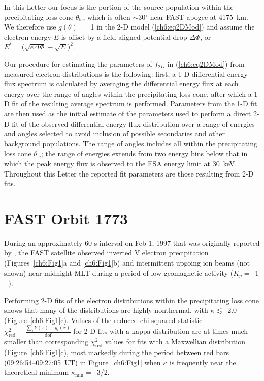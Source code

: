 
  In this Letter our focus is the portion of the source population
  within the precipitating loss cone $\theta_{\textrm{lc}}$, which is
  often $\sim$30$^\circ$ near FAST apogee at 4175~km. We therefore use
  $g(\theta) =$~1 in the 2-D model (\ref{ch6:eq2DMod}) and assume the
  electron energy $E$ is offset by a field-aligned potential drop
  $\Delta \Phi$, or $E^* = \big( \sqrt{e \Delta \Phi} - \sqrt{E}
  \big)^2$.

  Our procedure for estimating the parameters of $f_{2D}$ in
  (\ref{ch6:eq2DMod}) from measured electron distributions is the
  following: first, a 1-D differential energy flux spectrum is
  calculated by averaging the differential energy flux at each energy
  over the range of angles within the precipitating loss cone, after
  which a 1-D fit of the resulting average spectrum is
  performed. Parameters from the 1-D fit are then used as the initial
  estimate of the parameters used to perform a direct 2-D fit of the
  observed differential energy flux distribution over a range of
  energies and angles selected to avoid inclusion of possible
  secondaries and other background populations. The range of angles
  includes all within the precipitating loss cone
  $\theta_{\textrm{lc}}$; the range of energies extends from two
  energy bins below that in which the peak energy flux is observed to
  the ESA energy limit at 30~keV. Throughout this Letter the reported
  fit parameters are those resulting from 2-D fits.

  \section{FAST Orbit 1773}

  During an approximately 60-s interval on Feb 1, 1997 that was
  originally reported by \citet{Elphic1998}, the FAST satellite
  observed inverted V electron precipitation (Figures~\ref{ch6:Fig1}a
  and \ref{ch6:Fig1}b) and intermittent upgoing ion beams (not shown)
  near midnight MLT during a period of low geomagnetic activity ($K_p
  =$~1$^-$).

  Performing 2-D fits of the electron distributions within the
  precipitating loss cone shows that many of the distributions are
  highly nonthermal, with $\kappa \lesssim$~2.0
  (Figure~\ref{ch6:Fig1}c). Values of the reduced chi-squared
  statistic $\chi^2_{\mathrm{red}} = \frac{\sum_i Y(x) -
    y_i(x)}{\mathrm{dof}}$ for 2-D fits with a kappa distribution are
  at times much smaller than corresponding $\chi^2_{\textrm{red}}$
  values for fits with a Maxwellian distribution
  (Figure~\ref{ch6:Fig1}c), most markedly during the period between
  red bars (09:26:54--09:27:05~UT) in Figure~\ref{ch6:Fig1} when
  $\kappa$ is frequently near the theoretical minimum
  $\kappa_{\mathrm{min}} =$~3/2.

